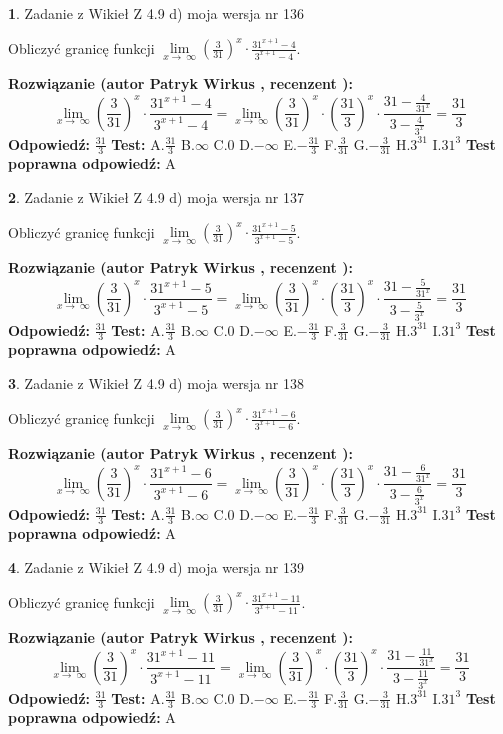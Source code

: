 \documentclass[12pt, a4paper]{article}
\theoremstyle{definition} %
\newtheorem{zad}{}
\newcommand{\zadStart}[1]{\begin{zad}#1\newline}
\newcommand{\zadStop}{\end{zad}}
\newcommand{\rozwStart}[2]{\noindent \textbf{Rozwiązanie (autor #1 , recenzent #2): }\newline}
\newcommand{\rozwStop}{\newline}
\newcommand{\odpStart}{\noindent \textbf{Odpowiedź:}\newline}
\newcommand{\odpStop}{\newline}
\newcommand{\testStart}{\noindent \textbf{Test:}\newline}
\newcommand{\testStop}{\newline}
\newcommand{\kluczStart}{\noindent \textbf{Test poprawna odpowiedź:}\newline}
\newcommand{\kluczStop}{\newline}
\begin{document}
\zadStart{Zadanie z Wikieł Z 4.9 d) moja wersja nr 136}


Obliczyć granicę funkcji  $\lim\limits_{x\to\ \infty}(\frac{3}{31})^{x}\cdot\frac{31^{x+1}-4}{3^{x+1}-4}$.
\zadStop
\rozwStart{Patryk Wirkus}{}
$$\lim\limits_{x\to\ \infty}(\frac{3}{31})^{x}\cdot\frac{31^{x+1}-4}{3^{x+1}-4}=\lim\limits_{x\to\ \infty}(\frac{3}{31})^{x}\cdot(\frac{31}{3})^{x} \cdot \frac{31-\frac{4}{31^{x}}}{3-\frac{4}{3^{x}}} = \frac{31}{3}$$
\rozwStop
\odpStart
$\frac{31}{3}$
\odpStop
\testStart
A.$\frac{31}{3}$ B.$\infty$ C.$0$ D.$-\infty$ E.$-\frac{31}{3}$
F.$\frac{3}{31}$ G.$-\frac{3}{31}$
H.$3^{31}$
I.$31^{3}$
\testStop
\kluczStart
A
\kluczStop



\zadStart{Zadanie z Wikieł Z 4.9 d) moja wersja nr 137}


Obliczyć granicę funkcji  $\lim\limits_{x\to\ \infty}(\frac{3}{31})^{x}\cdot\frac{31^{x+1}-5}{3^{x+1}-5}$.
\zadStop
\rozwStart{Patryk Wirkus}{}
$$\lim\limits_{x\to\ \infty}(\frac{3}{31})^{x}\cdot\frac{31^{x+1}-5}{3^{x+1}-5}=\lim\limits_{x\to\ \infty}(\frac{3}{31})^{x}\cdot(\frac{31}{3})^{x} \cdot \frac{31-\frac{5}{31^{x}}}{3-\frac{5}{3^{x}}} = \frac{31}{3}$$
\rozwStop
\odpStart
$\frac{31}{3}$
\odpStop
\testStart
A.$\frac{31}{3}$ B.$\infty$ C.$0$ D.$-\infty$ E.$-\frac{31}{3}$
F.$\frac{3}{31}$ G.$-\frac{3}{31}$
H.$3^{31}$
I.$31^{3}$
\testStop
\kluczStart
A
\kluczStop



\zadStart{Zadanie z Wikieł Z 4.9 d) moja wersja nr 138}


Obliczyć granicę funkcji  $\lim\limits_{x\to\ \infty}(\frac{3}{31})^{x}\cdot\frac{31^{x+1}-6}{3^{x+1}-6}$.
\zadStop
\rozwStart{Patryk Wirkus}{}
$$\lim\limits_{x\to\ \infty}(\frac{3}{31})^{x}\cdot\frac{31^{x+1}-6}{3^{x+1}-6}=\lim\limits_{x\to\ \infty}(\frac{3}{31})^{x}\cdot(\frac{31}{3})^{x} \cdot \frac{31-\frac{6}{31^{x}}}{3-\frac{6}{3^{x}}} = \frac{31}{3}$$
\rozwStop
\odpStart
$\frac{31}{3}$
\odpStop
\testStart
A.$\frac{31}{3}$ B.$\infty$ C.$0$ D.$-\infty$ E.$-\frac{31}{3}$
F.$\frac{3}{31}$ G.$-\frac{3}{31}$
H.$3^{31}$
I.$31^{3}$
\testStop
\kluczStart
A
\kluczStop



\zadStart{Zadanie z Wikieł Z 4.9 d) moja wersja nr 139}


Obliczyć granicę funkcji  $\lim\limits_{x\to\ \infty}(\frac{3}{31})^{x}\cdot\frac{31^{x+1}-11}{3^{x+1}-11}$.
\zadStop
\rozwStart{Patryk Wirkus}{}
$$\lim\limits_{x\to\ \infty}(\frac{3}{31})^{x}\cdot\frac{31^{x+1}-11}{3^{x+1}-11}=\lim\limits_{x\to\ \infty}(\frac{3}{31})^{x}\cdot(\frac{31}{3})^{x} \cdot \frac{31-\frac{11}{31^{x}}}{3-\frac{11}{3^{x}}} = \frac{31}{3}$$
\rozwStop
\odpStart
$\frac{31}{3}$
\odpStop
\testStart
A.$\frac{31}{3}$ B.$\infty$ C.$0$ D.$-\infty$ E.$-\frac{31}{3}$
F.$\frac{3}{31}$ G.$-\frac{3}{31}$
H.$3^{31}$
I.$31^{3}$
\testStop
\kluczStart
A
\kluczStop
\end{document}
